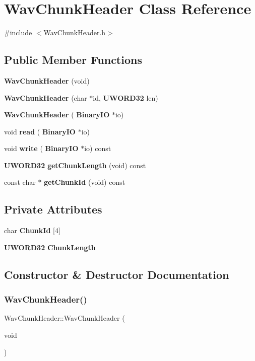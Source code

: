 \section{Wav\+Chunk\+Header Class Reference}
\label{classWavChunkHeader}


{\ttfamily \#include $<$Wav\+Chunk\+Header.\+h$>$}

\subsection*{Public Member Functions}
\begin{DoxyCompactItemize}
\item 
\textbf{ Wav\+Chunk\+Header} (void)
\item 
\textbf{ Wav\+Chunk\+Header} (char $\ast$id, \textbf{ U\+W\+O\+R\+D32} len)
\item 
\textbf{ Wav\+Chunk\+Header} (\textbf{ Binary\+IO} $\ast$io)
\item 
void \textbf{ read} (\textbf{ Binary\+IO} $\ast$io)
\item 
void \textbf{ write} (\textbf{ Binary\+IO} $\ast$io) const
\item 
\textbf{ U\+W\+O\+R\+D32} \textbf{ get\+Chunk\+Length} (void) const
\item 
const char $\ast$ \textbf{ get\+Chunk\+Id} (void) const
\end{DoxyCompactItemize}
\subsection*{Private Attributes}
\begin{DoxyCompactItemize}
\item 
char \textbf{ Chunk\+Id} [4]
\item 
\textbf{ U\+W\+O\+R\+D32} \textbf{ Chunk\+Length}
\end{DoxyCompactItemize}


\subsection{Constructor \& Destructor Documentation}
\mbox{\label{classWavChunkHeader_a301119c81ae995ebf513cb4fc27fdbc9}} 
\subsubsection{Wav\+Chunk\+Header()\hspace{0.1cm}{\footnotesize\ttfamily [1/3]}}
{\footnotesize\ttfamily Wav\+Chunk\+Header\+::\+Wav\+Chunk\+Header (\begin{DoxyParamCaption}\item[{void}]{ }\end{DoxyParamCaption})\hspace{0.3cm}{\ttfamily [inline]}}

